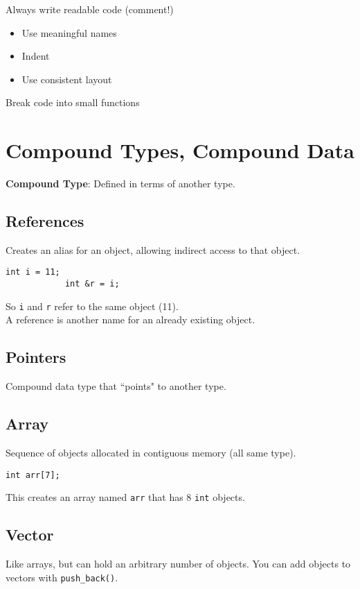 \documentclass{article}
\begin{document}
	Always write readable code (comment!)
	\begin{itemize}
		\item Use meaningful names
		\item Indent
		\item Use consistent layout
	\end{itemize}
	Break code into small functions
	
	
	\section{Compound Types, Compound Data}
	
	\textbf{Compound Type}: Defined in terms of another type.
	
	\subsection{References}
	
	Creates an alias for an object, allowing indirect access to that object.
	\begin{lstlisting}[gobble=4]
			int i = 11;
			int &r = i;
	\end{lstlisting}
	So \verb|i| and \verb|r| refer to the same object (11).\\
	
	A reference is another name for an already existing object.
	
	\subsection{Pointers}
	
	Compound data type that ``points" to another type.
	
	\subsection{Array}
	
	Sequence of objects allocated in contiguous memory (all same type).
	\begin{lstlisting}[gobble=4]
			int arr[7];
	\end{lstlisting}
	This creates an array named \verb|arr| that has 8 \verb|int| objects.
	
	\subsection{Vector}
	
	Like arrays, but can hold an arbitrary number of objects. You can add objects to vectors with \verb|push_back()|.
	
\end{document}
